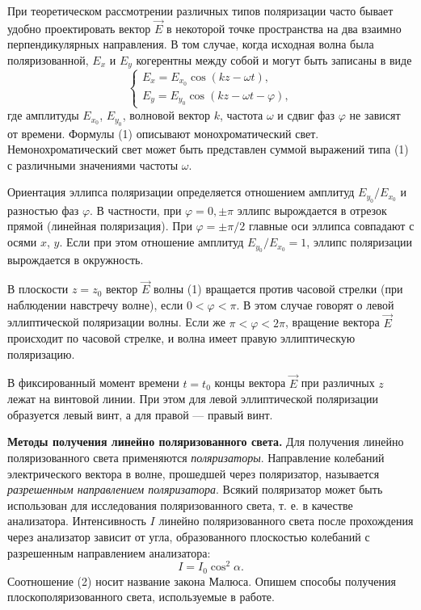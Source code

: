 \documentclass[11pt]{article}
\begin{document}
    При теоретическом рассмотрении различных типов поляризации часто бывает удобно проектировать вектор $\vec{E}$ в некоторой точке пространства на два взаимно перпендикулярных направления. В том случае, когда исходная волна была поляризованной, $E_x$ и $E_y$ когерентны между собой и могут быть записаны в виде
    \begin{equation}
    \begin{cases}
    E_x = E_{x_0}\cos(kz - \omega t),\\
    E_y = E_{y_0}\cos(kz - \omega t-\varphi),
    \end{cases}
    \end{equation}
    где амплитуды $E_{x_0}$, $E_{y_0}$, волновой вектор $k$, частота $\omega$ и сдвиг фаз $\varphi$ не зависят от времени. Формулы (1) описывают монохроматический свет. Немонохроматический свет может быть представлен суммой выражений типа (1) с различными значениями частоты $\omega$.
    
    Ориентация эллипса поляризации определяется отношением амплитуд $E_{y_0}/E_{x_0}$ и разностью фаз $\varphi$. В частности, при $\varphi = 0, \pm\pi$ эллипс вырождается в отрезок прямой (линейная поляризация). При $\varphi = \pm\pi/2$ главные оси эллипса совпадают с осями $x$, $y$. Если при этом отношение амплитуд $E_{y_0}/E_{x_0} = 1$, эллипс поляризации вырождается в окружность.   
    
    В плоскости $z = z_0$ вектор $\vec{E}$ волны (1) вращается против часовой стрелки (при наблюдении навстречу волне), если $0 < \varphi < \pi$. В этом случае говорят о левой эллиптической поляризации волны. Если же
    $\pi < \varphi < 2\pi$, вращение вектора $\vec{E}$ происходит по часовой стрелке, и волна имеет правую эллиптическую поляризацию.
    
    
    В фиксированный момент времени $t = t_0$ концы вектора $\vec{E}$ при различных $z$ лежат на винтовой линии. При этом для левой эллиптической поляризации образуется левый винт, а для правой --- правый винт.
    
    \textbf{Методы получения линейно поляризованного света.} Для получения линейно поляризованного света применяются \textit{поляризаторы}. Направление колебаний электрического вектора в волне, прошедшей через поляризатор, называется \textit{разрешенным направлением поляризатора}. Всякий поляризатор может быть использован для исследования поляризованного света, т. е. в качестве анализатора. Интенсивность $I$ линейно поляризованного света после прохождения через анализатор зависит от угла, образованного плоскостью колебаний с разрешенным направлением анализатора:
    \begin{equation}
    I = I_0 \cos^2\alpha.
    \end{equation}
    Соотношение (2) носит название закона Малюса. Опишем способы получения плоскополяризованного света, используемые в работе.
    
\end{document}
